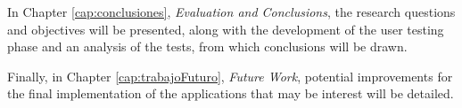 \medskip

In Chapter \ref{cap:conclusiones}, \textit{Evaluation and Conclusions}, the research questions and objectives will be presented, along with the development of the user testing phase and an analysis of the tests, from which conclusions will be drawn.

\medskip

Finally, in Chapter \ref{cap:trabajoFuturo}, \textit{Future Work}, potential improvements for the final implementation of the applications that may be interest will be detailed.








